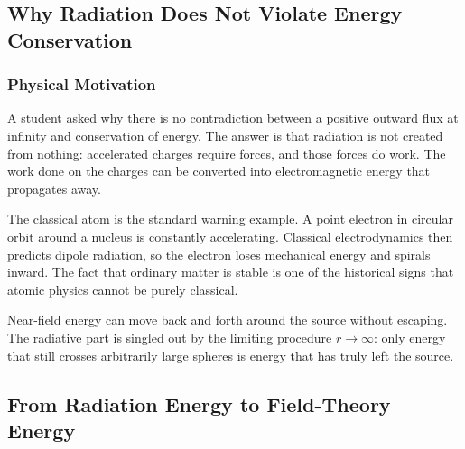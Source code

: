 
\subsection{Why Radiation Does Not Violate Energy Conservation}
\label{subsec:lec22:energy-conservation}

\subsubsection*{Physical Motivation}
A student asked why there is no contradiction between a positive outward flux at
infinity and conservation of energy. The answer is that radiation is not created from
nothing: accelerated charges require forces, and those forces do work. The work done
on the charges can be converted into electromagnetic energy that propagates away.

\begin{remark}
The classical atom is the standard warning example. A point electron in circular orbit
around a nucleus is constantly accelerating. Classical electrodynamics then predicts
dipole radiation, so the electron loses mechanical energy and spirals inward. The fact
that ordinary matter is stable is one of the historical signs that atomic physics
cannot be purely classical.
\end{remark}

Near-field energy can move back and forth around the source without escaping. The
radiative part is singled out by the limiting procedure $r\to\infty$: only energy that
still crosses arbitrarily large spheres is energy that has truly left the source.

\subsection{From Radiation Energy to Field-Theory Energy}
\label{subsec:lec22:field-theory-motivation}

